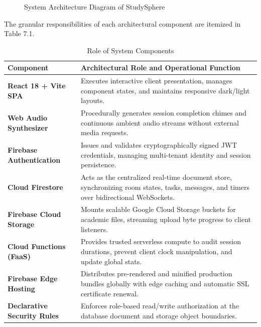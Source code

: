 \documentclass[12pt,a4paper,openany]{report}
\newcommand{\hdr}{\rowcolor{gray!25}}
\newcommand{\sectn}[2]{\par\needspace{4\baselineskip}\vspace{0.2cm}\noindent{\bfseries #1\ \ \MakeUppercase{#2}:}\par\nopagebreak}
\begin{document}
\begin{figure}[H]
{}
\caption{System Architecture Diagram of StudySphere}
\end{figure}
 
\sectn{7.2}{Role of Each Component}
The granular responsibilities of each architectural component are itemized in Table 7.1.
 
\begin{table}[H]
\centering
\caption{Role of System Components}
\small
\begin{tabularx}{\textwidth}{|p{4.2cm}|Y|}
\hline
\hdr\textbf{Component} & \textbf{Architectural Role and Operational Function} \\ \hline
\textbf{React 18 + Vite SPA} & Executes interactive client presentation, manages component states, and maintains responsive dark/light layouts. \\ \hline
\textbf{Web Audio Synthesizer} & Procedurally generates session completion chimes and continuous ambient audio streams without external media requests. \\ \hline
\textbf{Firebase Authentication} & Issues and validates cryptographically signed JWT credentials, managing multi-tenant identity and session persistence. \\ \hline
\textbf{Cloud Firestore} & Acts as the centralized real-time document store, synchronizing room states, tasks, messages, and timers over bidirectional WebSockets. \\ \hline
\textbf{Firebase Cloud Storage} & Mounts scalable Google Cloud Storage buckets for academic files, streaming upload byte progress to client listeners. \\ \hline
\textbf{Cloud Functions (FaaS)} & Provides trusted serverless compute to audit session durations, prevent client clock manipulation, and update global stats. \\ \hline
\textbf{Firebase Edge Hosting} & Distributes pre-rendered and minified production bundles globally with edge caching and automatic SSL certificate renewal. \\ \hline
\textbf{Declarative Security Rules} & Enforces role-based read/write authorization at the database document and storage object boundaries. \\ \hline
\end{tabularx}
\end{table}
\end{document}
